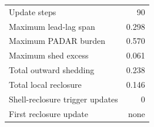 \begin{tabular}{lr}
\toprule
Update steps & 90 \\
Maximum lead-lag span & 0.298 \\
Maximum PADAR burden & 0.570 \\
Maximum shed excess & 0.061 \\
Total outward shedding & 0.238 \\
Total local reclosure & 0.146 \\
Shell-reclosure trigger updates & 0 \\
First reclosure update & none \\
\bottomrule
\end{tabular}
